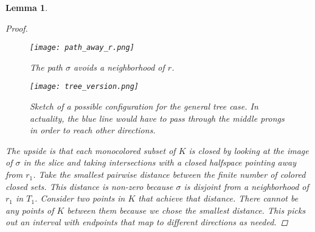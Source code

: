 \documentclass[12pt,parskip=full]{report}
\theoremstyle{plain}
\newtheorem{lem}[thm]{Lemma}
\theoremstyle{definition}
\begin{document}
\begin{lem}
\begin{proof}
\begin{figure}[!h]
    \centering
    \texttt{[image: path\_away\_r.png]}
    \caption{The path $\sigma$ avoids a neighborhood of $r$.}
    \label{fig:square}
\end{figure}

\begin{figure}[!h]
    \centering
    \texttt{[image: tree\_version.png]}
    \caption{Sketch of a possible configuration for the general tree case. In actuality, the blue line would have to pass through the middle prongs in order to reach other directions.}
    \label{fig:square}
\end{figure}

        The upside is that each monocolored subset of \(K\) is closed by looking at the image of \(\sigma\) in the slice and taking intersections with a closed halfspace pointing away from \(r_{1}\). Take the smallest pairwise distance between the finite number of colored closed sets. This distance is non-zero because \(\sigma\) is disjoint from a neighborhood of $r_1$ in $T_1$. Consider two points in \(K\) that achieve that distance. There cannot be any points of \(K\) between them because we chose the smallest distance. This picks out an interval with endpoints that map to different directions as needed.
     \end{proof}
 

\end{lem}
\end{document}
